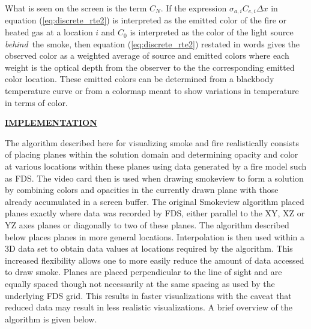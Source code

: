 \documentclass[11pt]{article}
\newcommand{\ssection}[1]{\underline{\bf #1}}
\begin{document}
\noindent What is seen on the screen is the term $C_N$.
If the expression $\sigma_{a,i}C_{e,i}\Delta x$ in equation (\ref{eq:discrete_rte2}) is interpreted as
the emitted color of the fire or
heated gas at a location $i$ and $C_0$ is interpreted as the color
of the light source {\em behind}\ the smoke, then equation
(\ref{eq:discrete_rte2}) restated in words gives the observed color
as a weighted average of source and emitted
colors where each weight is the optical depth from the observer to
the the corresponding emitted color location.  These emitted colors can be
determined from a blackbody temperature curve or from a colormap
meant to show variations in temperature in terms of color.


\ssection{IMPLEMENTATION}

The algorithm described here for visualizing smoke and fire realistically consists of placing
planes within the solution domain and determining opacity and color
at various locations within these planes
using data generated by a fire model such as FDS.  The video card then is
used when drawing smokeview to form a solution by combining colors and opacities in the currently drawn
plane with those already accumulated in a screen buffer.
The original Smokeview algorithm placed planes exactly where data was recorded by FDS,
either parallel to the XY, XZ or YZ axes planes or diagonally to two of these planes.
The algorithm described below places planes in more general locations. Interpolation is then used
within a 3D data set to obtain data values at locations required by the algorithm.
This increased flexibility
allows one to more easily reduce the amount of data accessed to draw smoke.
Planes are placed perpendicular to the line of sight and are equally spaced though not
necessarily at the same spacing as used by the underlying FDS grid.
This results in faster visualizations with the caveat that reduced data may result
in less realistic visualizations.  A brief overview of the algorithm is given below.
\end{document}
